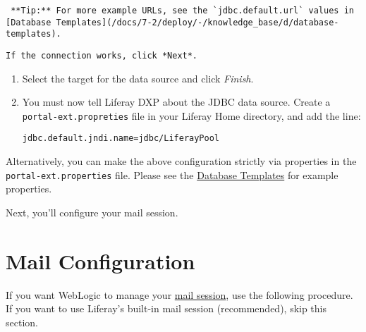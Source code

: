 \noindent\hrulefill

\begin{verbatim}
 **Tip:** For more example URLs, see the `jdbc.default.url` values in [Database Templates](/docs/7-2/deploy/-/knowledge_base/d/database-templates).
\end{verbatim}

\noindent\hrulefill

\begin{verbatim}
If the connection works, click *Next*.
\end{verbatim}

\begin{enumerate}
\def\labelenumi{\arabic{enumi}.}
\setcounter{enumi}{6}
\item
  Select the target for the data source and click \emph{Finish}.
\item
  You must now tell Liferay DXP about the JDBC data source. Create a
  \texttt{portal-ext.propreties} file in your Liferay Home directory,
  and add the line:

\begin{verbatim}
jdbc.default.jndi.name=jdbc/LiferayPool
\end{verbatim}
\end{enumerate}

Alternatively, you can make the above configuration strictly via
properties in the \texttt{portal-ext.properties} file. Please see the
\href{/docs/7-2/deploy/-/knowledge_base/d/database-templates}{Database
Templates} for example properties.

Next, you'll configure your mail session.

\section{Mail Configuration}\label{mail-configuration-1}

If you want WebLogic to manage your
\href{/docs/7-2/deploy/-/knowledge_base/d/configuring-mail}{mail
session}, use the following procedure. If you want to use Liferay's
built-in mail session (recommended), skip this section.

